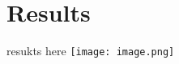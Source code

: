 \documentclass{article}
\begin{document}
\tableofcontents
\newpage
\section{Results}
resukts here
\texttt{[image: image.png]}
\newpage
\end{document}

